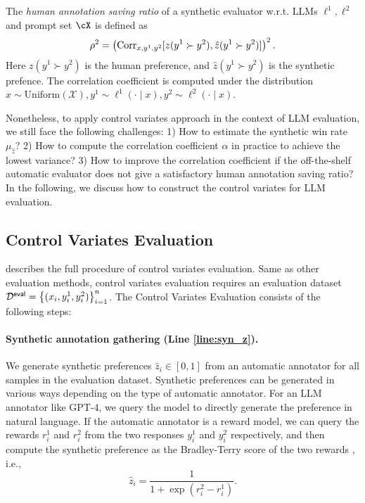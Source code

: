 \begin{definition}
The \emph{human annotation saving ratio} of a synthetic evaluator w.r.t. LLMs $\ell^1,\ell^2$ and prompt set $\cX$ is defined as 
\begin{align*}
    \rho^2 = \left(\operatorname{\mathrm{Corr}}\limits_{x,y^1,y^2}[z(y^1\succ y^2), \hat z(y^1\succ y^2)]\right)^2.
\end{align*}
Here $z(y^1\succ y^2)$ is the human preference, and $\hat z(y^1\succ y^2)$ is the synthetic prefence. The correlation coefficient is computed under the distribution $x \sim \mathrm{Uniform}(\mathcal{X}), y^1 \sim \ell^1(\cdot \mid x), y^2 \sim \ell^2(\cdot \mid x)$. 

\end{definition}


 Nonetheless, to apply control variates approach in the context of LLM evaluation, we still face the following challenges: 1) How to estimate the synthetic win rate $\mu_{\hat z}$? 2) How to compute the correlation coefficient $\alpha$ in practice to achieve the lowest variance? 3) How to improve the correlation coefficient if the off-the-shelf automatic evaluator does not give a satisfactory human annotation saving ratio?
In the following, we discuss how to construct the control variates for LLM evaluation.

\subsection{Control Variates Evaluation}
 describes the full procedure of control variates evaluation. Same as other evaluation methods, control variates evaluation requires an evaluation dataset $\mathcal{D}^{\mathsf{eval}} = \left\{(x_i,y_i^1, y_i^2)\right\}_{i=1}^n$.
The Control Variates Evaluation consists of the following steps: \loose
\paragraph{Synthetic annotation gathering (Line \ref{line:syn_z}).}
We generate synthetic preferences $\hat z_i \in [0,1]$ from an automatic annotator for all samples in the evaluation dataset. Synthetic preferences can be generated in various ways depending on the type of automatic annotator. For an LLM annotator like GPT-4, we query the model to directly generate the preference in natural language. If the automatic annotator is a reward model, we can query the rewards $r_i^1$ and $r_i^2$ from the two responses $y_i^1$ and $y_i^2$ respectively, and then compute the synthetic preference as the Bradley-Terry score of the two rewards \citep{bradley1952rank}, i.e.,  
\[
    \hat z_i = \frac{1}{1 + \exp(r_i^2-r_i^1)}.
\]
